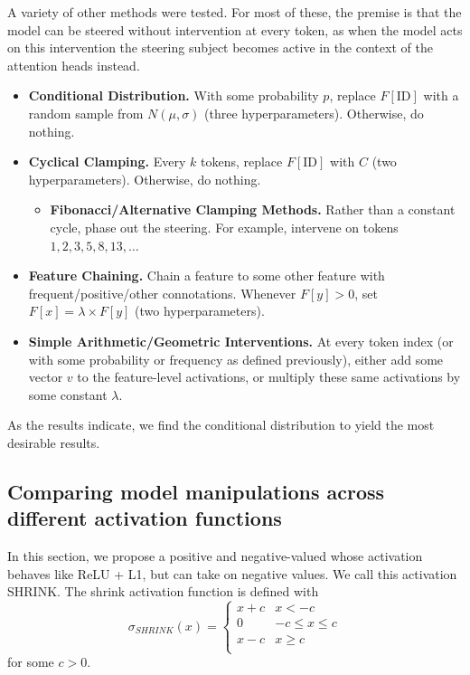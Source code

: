 \documentclass{article}
\begin{document}
A variety of other methods were tested. For most of these, the premise is that the model can be steered without intervention at every token, as when the model acts on this intervention the steering subject becomes active in the context of the attention heads instead. 
\begin{itemize}
    \item \textbf{Conditional Distribution.} With some probability $p$, replace $F[\text{ID}]$ with a random sample from $N(\mu, \sigma)$ (three hyperparameters). Otherwise, do nothing.
    \item \textbf{Cyclical Clamping.} Every $k$ tokens, replace $F[\text{ID}]$ with $C$ (two hyperparameters). Otherwise, do nothing.
    \begin{itemize}
        \item \textbf{Fibonacci/Alternative Clamping Methods.} Rather than a constant cycle, phase out the steering. For example, intervene on tokens $1,2,3,5,8,13,\dots$
    \end{itemize}
    \item \textbf{Feature Chaining.} Chain a feature to some other feature with frequent/positive/other connotations. Whenever $F[y]>0$, set $F[x]=\lambda \times F[y]$ (two hyperparameters).
    \item \textbf{Simple Arithmetic/Geometric Interventions.} At every token index (or with some probability or frequency as defined previously), either add some vector $v$ to the feature-level activations, or multiply these same activations by some constant $\lambda$. 
\end{itemize}

As the results indicate, we find the conditional distribution to yield the most desirable results.

\subsection{Comparing model manipulations across different activation functions}
In this section, we propose a positive and negative-valued whose activation behaves like ReLU + L1, but can take on negative values. We call this activation SHRINK. The shrink activation function is defined with
    $$\sigma_{SHRINK}(x) = \begin{cases}
        x+c & x < -c\\
        0 & -c \leq x \leq c\\
        x - c & x\geq c\\
    \end{cases}$$
    for some $c > 0$.\\
\end{document}
